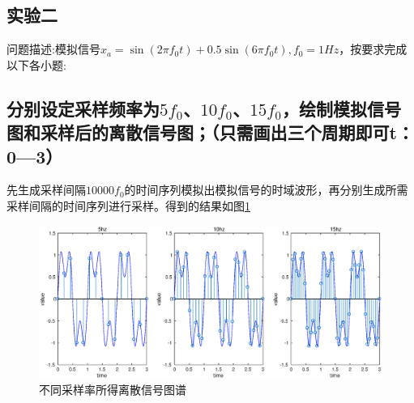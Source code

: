 \documentclass[UTF8]{article}
\begin{document}
\begin{CJK}{UTF8}{gkai}
\section{实验二}
问题描述:模拟信号$x_a=\sin(2\pi f_0t)+0.5\sin(6\pi f_0t),f_0=1Hz$，按要求完成以下各小题:
\subsection{分别设定采样频率为$5f_0$、$10f_0$、$15f_0$，绘制模拟信号图和采样后的离散信号图；（只需画出三个周期即可t：0—3）}
先生成采样间隔$10000f_0$的时间序列模拟出模拟信号的时域波形，再分别生成所需采样间隔的时间序列进行采样。得到的结果如图\ref{pro2_fig1}
\begin{figure}
  \includegraphics[scale=0.3]{pro2_subpro1.eps}
  \caption{不同采样率所得离散信号图谱}
  \label{pro2_fig1}
\end{figure}

\end{CJK}
\end{document}

